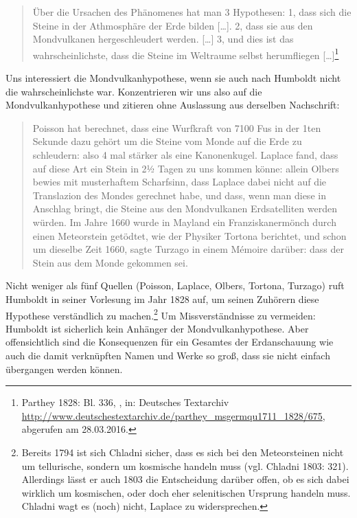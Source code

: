 \documentclass[a4paper,
fontsize=11pt,
oneside,
numbers=noperiodatend,
parskip=half-,
bibliography=totoc,
final
]{scrartcl}
\begin{document}
\begin{quote}
Über die Ursachen des Phänomenes hat man 3 Hypothesen: 1, dass sich die
Steine in der Athmosphäre der Erde bilden {[}\ldots{}{]}. 2, dass sie
aus den Mondvulkanen hergeschleudert werden. {[}\ldots{}{]} 3, und dies
ist das wahrscheinlichste, dass die Steine im Weltraume selbst
herumfliegen {[}\ldots{}{]}\footnote{Parthey 1828: Bl. 336, , in:
  Deutsches Textarchiv
  \url{http://www.deutschestextarchiv.de/parthey_msgermqu1711_1828/675},
  abgerufen am 28.03.2016.}
\end{quote}

Uns interessiert die Mondvulkanhypothese, wenn sie auch nach Humboldt
nicht die wahrscheinlichste war. Konzentrieren wir uns also auf die
Mondvulkanhypothese und zitieren ohne Auslassung aus derselben
Nachschrift:

\begin{quote}
Poisson hat berechnet, dass eine Wurfkraft von 7100 Fus in der 1ten
Sekunde dazu gehört um die Steine vom Monde auf die Erde zu schleudern:
also 4 mal stärker als eine Kanonenkugel. Laplace fand, dass auf diese
Art ein Stein in 2½ Tagen zu uns kommen könne: allein Olbers bewies mit
musterhaftem Scharfsinn, dass Laplace dabei nicht auf die Translazion
des Mondes gerechnet habe, und dass, wenn man diese in Anschlag bringt,
die Steine aus den Mondvulkanen Erdsatelliten werden würden. Im Jahre
1660 wurde in Mayland ein Franziskanermönch durch einen Meteorstein
getödtet, wie der Physiker Tortona berichtet, und schon um dieselbe Zeit
1660, sagte Turzago in einem Mémoire darüber: dass der Stein aus dem
Monde gekommen sei.
\end{quote}

Nicht weniger als fünf Quellen (Poisson, Laplace, Olbers, Tortona,
Turzago) ruft Humboldt in seiner Vorlesung im Jahr 1828 auf, um seinen
Zuhörern diese Hypothese verständlich zu machen.\footnote{Bereits 1794
  ist sich Chladni sicher, dass es sich bei den Meteorsteinen nicht um
  tellurische, sondern um kosmische handeln muss (vgl. Chladni 1803:
  321). Allerdings lässt er auch 1803 die Entscheidung darüber offen, ob
  es sich dabei wirklich um kosmischen, oder doch eher selenitischen
  Ursprung handeln muss. Chladni wagt es (noch) nicht, Laplace zu
  widersprechen.} Um Missverständnisse zu vermeiden: Humboldt ist
sicherlich kein Anhänger der Mondvulkanhypothese. Aber offensichtlich
sind die Konsequenzen für ein Gesamtes der Erdanschauung wie auch die
damit verknüpften Namen und Werke so groß, dass sie nicht einfach
übergangen werden können.
\end{document}
